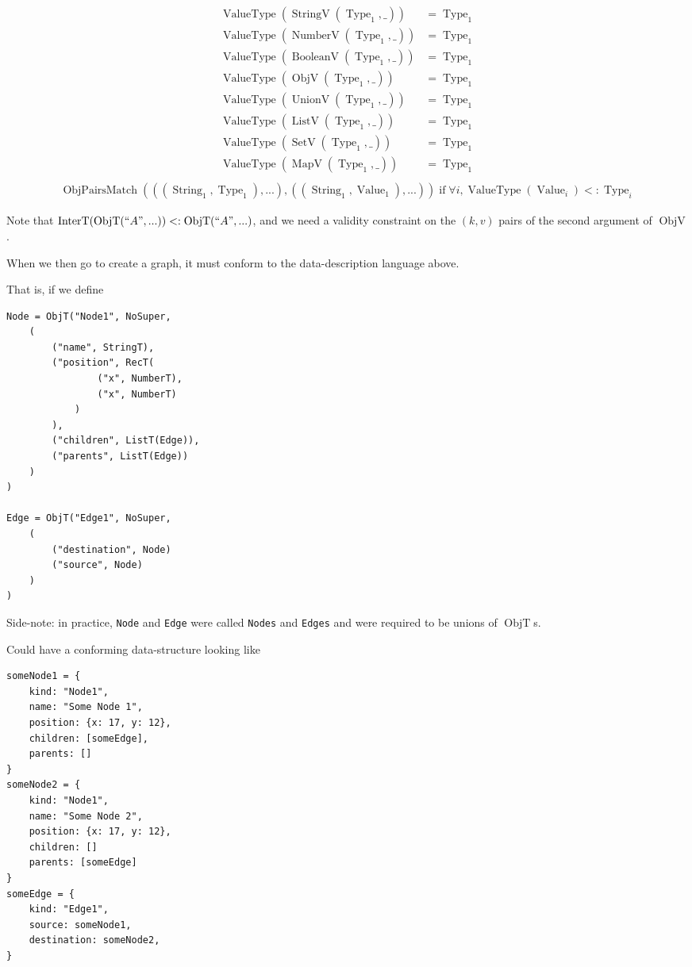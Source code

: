 \documentclass{article}
\DeclareMathOperator{\ObjT}{ObjT}
\DeclareMathOperator{\InterT}{InterT}
\DeclareMathOperator{\String}{String}
\DeclareMathOperator{\Type}{Type}
\DeclareMathOperator{\Value}{Value}
\DeclareMathOperator{\StringV}{StringV}
\DeclareMathOperator{\NumberV}{NumberV}
\DeclareMathOperator{\BooleanV}{BooleanV}
\DeclareMathOperator{\ObjV}{ObjV}
\DeclareMathOperator{\ListV}{ListV}
\DeclareMathOperator{\SetV}{SetV}
\DeclareMathOperator{\MapV}{MapV}
\DeclareMathOperator{\UnionV}{UnionV}
\DeclareMathOperator{\ValueType}{ValueType}
\DeclareMathOperator{\ObjPairsMatch}{ObjPairsMatch}
\DeclareMathOperator{\textif}{ if }
\begin{document}
\begin{align*}
    \ValueType(\StringV(\Type_1, \_)) &= \Type_1 \\
    \ValueType(\NumberV(\Type_1, \_)) &= \Type_1 \\
    \ValueType(\BooleanV(\Type_1, \_)) &= \Type_1 \\
    \ValueType(\ObjV(\Type_1, \_)) &= \Type_1 \\
    \ValueType(\UnionV(\Type_1, \_)) &= \Type_1 \\
    \ValueType(\ListV(\Type_1, \_)) &= \Type_1 \\
    \ValueType(\SetV(\Type_1, \_)) &= \Type_1 \\
    \ValueType(\MapV(\Type_1, \_)) &= \Type_1 \\
\end{align*}
\begin{align*}
    \ObjPairsMatch(((\String_1, \Type_1),...), ((\String_1, \Value_1), ...)) 
    \textif \forall i, \ValueType(\Value_i) <: \Type_i
\end{align*}

Note that \(\InterT(\ObjT(``A", ...)) <: \ObjT(``A", ...)\), and we 
need a validity constraint on the \((k, v)\) pairs of the second argument
of \(\ObjV\).

When we then go to create a graph, it must conform to the 
data-description language above. 

That is, if we define 

\begin{verbatim}
Node = ObjT("Node1", NoSuper,
    (
        ("name", StringT),
        ("position", RecT(
                ("x", NumberT),
                ("x", NumberT)
            )
        ),
        ("children", ListT(Edge)),
        ("parents", ListT(Edge))
    )
)

Edge = ObjT("Edge1", NoSuper,
    (
        ("destination", Node)
        ("source", Node)
    )
)

\end{verbatim}

Side-note: in practice, \texttt{Node} and \texttt{Edge} were called 
\texttt{Nodes} and \texttt{Edges} and were required to be unions of 
\(\ObjT\)s. 


Could have a conforming data-structure looking like

\begin{verbatim}
someNode1 = {
    kind: "Node1",
    name: "Some Node 1",
    position: {x: 17, y: 12},
    children: [someEdge],
    parents: []
}
someNode2 = {
    kind: "Node1",
    name: "Some Node 2",
    position: {x: 17, y: 12},
    children: []
    parents: [someEdge]
}
someEdge = {
    kind: "Edge1",
    source: someNode1,
    destination: someNode2,
}
\end{verbatim}
\end{document}
